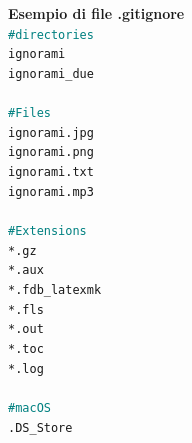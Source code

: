 \documentclass[12pt, a4paper]{article}
\begin{document}
\vspace{2.5 cm}
\noindent
\vspace{0.8 cm}
\noindent
\textbf{Esempio di file .gitignore}\\
\texttt{\textcolor{teal}{\#directories}}\\
\texttt{ignorami}\\
\texttt{ignorami\_due}\\\\
\texttt{\textcolor{teal}{\#Files}}\\
\texttt{ignorami.jpg}\\
\texttt{ignorami.png}\\
\texttt{ignorami.txt}\\
\texttt{ignorami.mp3}\\\\
\texttt{\textcolor{teal}{\#Extensions}}\\
\texttt{*.gz}\\
\texttt{*.aux}\\
\texttt{*.fdb\_latexmk}\\
\texttt{*.fls}\\
\texttt{*.out}\\
\texttt{*.toc}\\
\texttt{*.log}\\\\
\texttt{\textcolor{teal}{\#macOS}}\\
\texttt{.DS\_Store}\\
\end{document}
